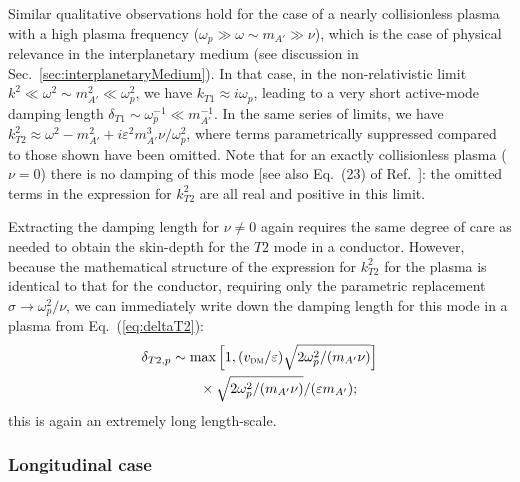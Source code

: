 \documentclass[amsmath,amssymb,aps,10pt,prd,letterpaper,nofootinbib,balancelastpage,notitlepage,superscriptaddress,twocolumn,floatfix]{revtex4-2}
\newcommand{\secref}[2][]{Sec{#1}.~\ref{#2}}		%
\renewcommand{\eqref}[2][]{Eq{#1}.~(\ref{eq:#2})}	%
\newcommand{\citeR}[2][]{Ref{#1}.~\cite{#2}}		%
\newcommand{\lb}{\ensuremath{\left}}					%
\newcommand{\rb}{\ensuremath{\right}}					%
\newcommand{\nl}{\nonumber \\ & \quad }					%
\begin{document}
Similar qualitative observations hold for the case of a nearly collisionless plasma with a high plasma frequency ($\omega_p\gg\omega \sim m_{A'}\gg\nu$), which is the case of physical relevance in the interplanetary medium (see discussion in \secref{sec:interplanetaryMedium}).
In that case, in the non-relativistic limit $k^2 \ll \omega^2 \sim m_{A'}^2 \ll \omega_p^2$, we have $k_{T1} \approx i \omega_p$, leading to a very short active-mode damping length $\delta_{T1} \sim \omega_p^{-1} \ll m_{A'}^{-1}$.
In the same series of limits, we have $k_{T2}^2 \approx \omega^2 - m_{A'}^2 + i\varepsilon^2 m_{A'}^3 \nu/\omega_p^2$, where terms parametrically suppressed compared to those shown have been omitted.
Note that for an exactly collisionless plasma ($\nu=0$) there is no damping of this mode [see also Eq.~(23) of \citeR{Dubovsky:2015cca}]: the omitted terms in the expression for $k_{T2}^2$ are all real and positive in this limit.

Extracting the damping length for $\nu \neq 0$ again requires the same degree of care as needed to obtain the skin-depth for the $T2$ mode in a conductor.
However, because the mathematical structure of the expression for $k_{T2}^2$ for the plasma is identical to that for the conductor, requiring only the parametric replacement $\sigma \rightarrow \omega_p^2/\nu$, we can immediately write down the damping length for this mode in a plasma from \eqref{deltaT2}: 
\begin{align}
    \delta_{T2,p} &\sim \text{max}\lb[ 1 , (v_{\textsc{dm}}/\varepsilon) \sqrt{2\omega_p^2/(m_{A'}\nu)} \rb] \nl \quad\times \sqrt{2\omega_p^2/(m_{A'}\nu)}/( \varepsilon m_{A'});
    \label{eq:deltaT2p}
\end{align}
this is again an extremely long length-scale.


\subsubsection{Longitudinal case}
\label{app:longitudinalCase}
\end{document}
